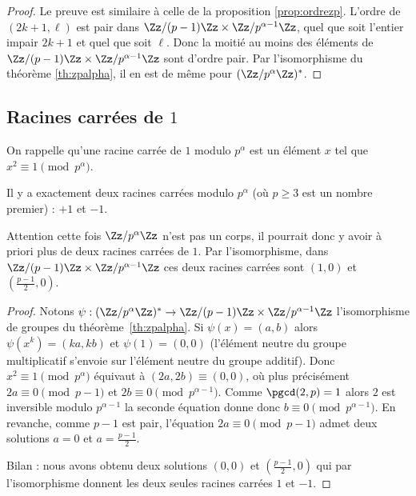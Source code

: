 \documentclass[11pt,class=report,crop=false]{standalone}
\begin{document}
\begin{proof}
Le preuve est similaire à celle de la proposition \ref{prop:ordrezp}.
L'ordre de $(2k+1,\ell)$ est pair dans $\Zz/(p-1)\Zz \times \Zz/p^{\alpha-1}\Zz$, quel que soit l'entier impair $2k+1$ et quel que soit $\ell$. Donc la moitié au moins des éléments de $\Zz/(p-1)\Zz \times \Zz/p^{\alpha-1}\Zz$ sont d'ordre pair. 
Par l'isomorphisme du théorème \ref{th:zpalpha}, il en est de même pour $(\Zz/p^\alpha\Zz)^*$.
\end{proof}


\subsection{Racines carrées de $1$}

On rappelle qu'une racine carrée de $1$ modulo $p^\alpha$ est un élément $x$ tel que $x^2 \equiv 1 \pmod{p^\alpha}$. 

\begin{proposition}
\label{prop:racinezpalpha}
Il y a exactement deux racines carrées modulo $p^\alpha$ (où $p\ge3$ est un nombre premier) : $+1$ et $-1$.
\end{proposition}

Attention cette fois $\Zz/p^\alpha\Zz$ n'est pas un corps, il pourrait donc y avoir à priori plus de deux racines carrées de $1$.
Par l'isomorphisme, dans $\Zz/(p-1)\Zz \times \Zz/p^{\alpha-1}\Zz$ ces deux racines carrées sont $(1,0)$ et $(\frac{p-1}{2},0)$.

\begin{proof}
Notons $\psi :  (\Zz/p^\alpha\Zz)^* \to \Zz/(p-1)\Zz\times \Zz/p^{\alpha-1}\Zz$ l'isomorphisme de groupes du théorème~\ref{th:zpalpha}.
Si $\psi(x)=(a,b)$ alors $\psi(x^k) = (ka,kb)$ et $\psi(1)=(0,0)$ (l'élément neutre du groupe multiplicatif s'envoie sur l'élément neutre du groupe additif).
Donc $x^2 \equiv 1 \pmod{p^\alpha}$ équivaut à $(2a,2b) \equiv (0,0)$,
où plus précisément $2a \equiv 0 \pmod{p-1}$ et $2b \equiv 0 \pmod{p^{\alpha-1}}$.
Comme $\pgcd(2,p)=1$ alors $2$ est inversible modulo $p^{\alpha-1}$ la seconde équation donne donc $b\equiv 0 \pmod{p^{\alpha-1}}$.
En revanche, comme $p-1$ est pair, l'équation $2a \equiv 0 \pmod{p-1}$
admet deux solutions $a=0$ et $a=\frac{p-1}{2}$.
 
Bilan : nous avons obtenu deux solutions $(0,0)$ et $(\frac{p-1}{2},0)$ qui par l'isomorphisme donnent les deux seules racines carrées $1$ et $-1$.
\end{proof}
\end{document}
